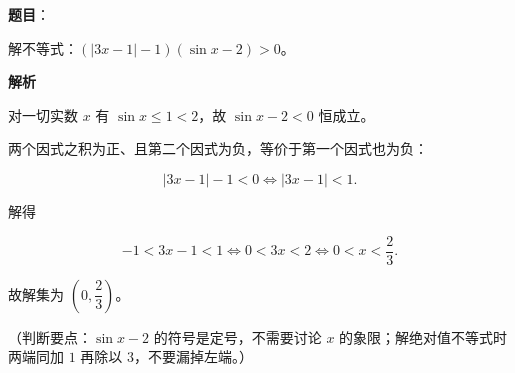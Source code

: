 \begin{answer}

\textbf{题目}：

解不等式：$(|3x-1|-1)(\sin x-2)>0$。

\textbf{解析}

对一切实数 $x$ 有 $\sin x\leqslant1<2$，故 $\sin x-2<0$ 恒成立。

两个因式之积为正、且第二个因式为负，等价于第一个因式也为负：

\nopagebreak[4]
\[|3x-1|-1<0\iff |3x-1|<1.\]

解得

\nopagebreak[4]
\[-1<3x-1<1\iff 0<3x<2\iff 0<x<\frac23.\]

故解集为 $\left(0,\dfrac23\right)$。

（判断要点：$\sin x-2$ 的符号是定号，不需要讨论 $x$ 的象限；解绝对值不等式时两端同加 $1$ 再除以 $3$，不要漏掉左端。）


\end{answer}
